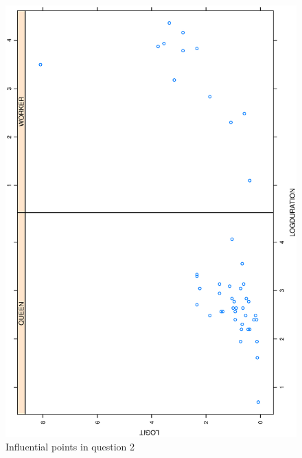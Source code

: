\documentclass[a4paper,10pt]{article}
\begin{document}
\begin{figure}
\includegraphics[angle=-90, width=1\textwidth]{figures/math650_hw7_fig2.eps}
\caption{Influential points in question 2}\label{f2}
\end{figure}
\end{document}
